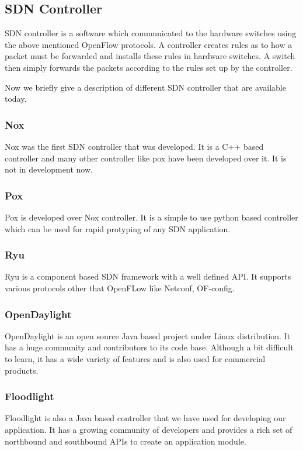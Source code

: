 \subsection{SDN Controller}
SDN controller is a software which communicated to the hardware switches using the above mentioned OpenFlow protocols. A controller creates rules as to how a packet must be forwarded and installs these rules in hardware switches. A switch then simply forwards the packets according to the rules set up by the controller.

Now we briefly give a description of different SDN controller that are available today.

\subsubsection{Nox}
Nox was the first SDN controller that was developed. It is a C++ based controller and many other controller like pox have been developed over it. It is not in development now.

\subsubsection{Pox}
Pox is developed over Nox controller. It is a simple to use python based controller which can be used for rapid protyping of any SDN application.

\subsubsection{Ryu}
Ryu is a component based SDN framework with a well defined API. It supports various protocols other that OpenFLow like Netconf, OF-config.

\subsubsection{OpenDaylight}
OpenDaylight is an open source Java based project under Linux distribution. It has a huge community and contributors to its code base. Although a bit difficult to learn, it has a wide variety of features and is also used for commercial products.

\subsubsection{Floodlight}
Floodlight is also a Java based controller that we have used for developing our application. It has a growing community of developers and provides a rich set of northbound and southbound APIs to create an application module. 

